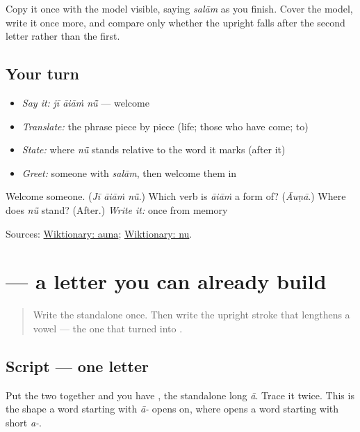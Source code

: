 Copy it once with the model visible, saying \emph{salām} as you finish. Cover the model, write it once more, and compare only whether the upright falls after the second letter rather than the first.

\subsection*{Your turn}
\begin{itemize}
\raggedright
  \item \emph{Say it:} \emph{jī āiāṁ nū̃} — welcome
  \item \emph{Translate:} the phrase piece by piece (life; those who have come; to)
  \item \emph{State:} where \emph{nū̃} stands relative to the word it marks (after it)
  \item \emph{Greet:} someone with \emph{salām}, then welcome them in
\end{itemize}

\begin{tcolorbox}[breakable,colback=teal!4,colframe=teal!35!black,title={Before you move on}]
Welcome someone. (\emph{Jī āiāṁ nū̃}.) Which verb is \emph{āiāṁ} a form of? (\emph{Āuṇā}.) Where does \emph{nū̃} stand? (After.) \emph{Write it:} \textbf{} once from memory

Sources: \href{https://en.wiktionary.org/wiki/\%E0\%A8\%86\%E0\%A8\%89\%E0\%A8\%A3\%E0\%A8\%BE}{Wiktionary: auna}; \href{https://en.wiktionary.org/wiki/\%E0\%A8\%A8\%E0\%A9\%82\%E0\%A9\%B0}{Wiktionary: nu}.
\end{tcolorbox}
\section[\texorpdfstring{\pa{ਆ} (aa)}{ਆ (aa)}]{ — a letter you can already build}

\label{lesson:PA-W09-aara}



\begin{quote}
Write the standalone \textbf{} once. Then write the upright stroke \textbf{} that lengthens a vowel — the one that turned \textbf{} into \textbf{}.
\end{quote}

\subsection*{Script — one letter}
Put the two together and you have \textbf{}, the standalone long \emph{ā}. Trace it twice. This is the shape a word starting with \emph{ā-} opens on, where \textbf{} opens a word starting with short \emph{a-}.

